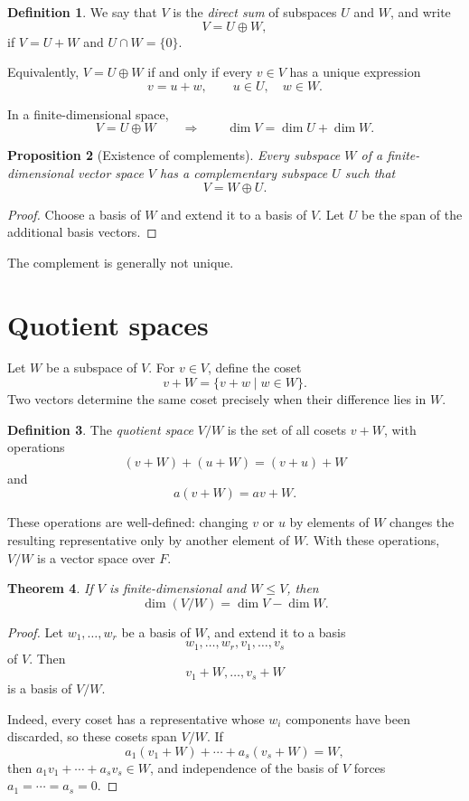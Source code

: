 \documentclass{amsbook}
\newtheorem{theorem}{Theorem}[chapter]
\newtheorem{proposition}[theorem]{Proposition}
\theoremstyle{definition}
\newtheorem{definition}[theorem]{Definition}
\theoremstyle{remark}
\numberwithin{section}{chapter}
\numberwithin{equation}{chapter}
\begin{document}
\begin{definition}
	We say that $V$ is the \emph{direct sum} of subspaces $U$ and $W$, and write
	\[
	V=U\oplus W,
	\]
	if $V=U+W$ and $U\cap W=\{0\}$.
\end{definition}

Equivalently, $V=U\oplus W$ if and only if every $v\in V$ has a unique expression
\[
v=u+w,\qquad u\in U,\quad w\in W.
\]

In a finite-dimensional space,
\[
V=U\oplus W
\qquad\Longrightarrow\qquad
\dim V=\dim U+\dim W.
\]

\begin{proposition}[Existence of complements]\label{prop:complement}
	Every subspace $W$ of a finite-dimensional vector space $V$ has a complementary subspace $U$ such that
	\[
	V=W\oplus U.
	\]
\end{proposition}

\begin{proof}
	Choose a basis of $W$ and extend it to a basis of $V$. Let $U$ be the span of the additional basis vectors.
\end{proof}

The complement is generally not unique.

\section{Quotient spaces}

Let $W$ be a subspace of $V$. For $v\in V$, define the coset
\[
v+W=\{v+w\mid w\in W\}.
\]
Two vectors determine the same coset precisely when their difference lies in $W$.

\begin{definition}
	The \emph{quotient space} $V/W$ is the set of all cosets $v+W$, with operations
	\[
	(v+W)+(u+W)=(v+u)+W
	\]
	and
	\[
	a(v+W)=av+W.
	\]
\end{definition}

These operations are well-defined: changing $v$ or $u$ by elements of $W$ changes the resulting representative only by another element of $W$. With these operations, $V/W$ is a vector space over $F$.

\begin{theorem}\label{thm:quotient-dimension}
	If $V$ is finite-dimensional and $W\le V$, then
	\[
	\dim(V/W)=\dim V-\dim W.
	\]
\end{theorem}

\begin{proof}
	Let $w_1,\dots,w_r$ be a basis of $W$, and extend it to a basis
	\[
	w_1,\dots,w_r,v_1,\dots,v_s
	\]
	of $V$. Then
	\[
	v_1+W,\dots,v_s+W
	\]
	is a basis of $V/W$.

	Indeed, every coset has a representative whose $w_i$ components have been discarded, so these cosets span $V/W$. If
	\[
	a_1(v_1+W)+\cdots+a_s(v_s+W)=W,
	\]
	then $a_1v_1+\cdots+a_sv_s\in W$, and independence of the basis of $V$ forces $a_1=\cdots=a_s=0$.
\end{proof}
\end{document}
